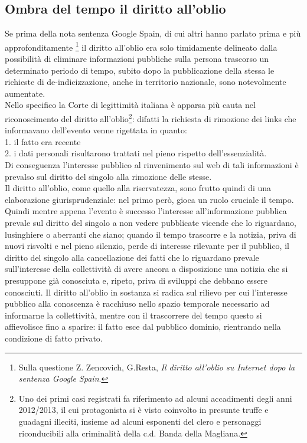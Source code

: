 \subsection{Ombra del tempo il diritto all'oblio}
Se prima della nota sentenza Google Spain, di cui altri hanno parlato prima e più approfonditamente \footnote{Sulla questione Z. Zencovich, G.Resta, \textit{Il diritto all’oblio su Internet dopo la sentenza Google Spain}.} il diritto all'oblio era solo timidamente delineato dalla possibilità di eliminare informazioni pubbliche sulla persona trascorso un determinato periodo di tempo, subito dopo la pubblicazione della stessa le richieste di de-indicizzazione, anche in territorio nazionale, sono notevolmente aumentate.
\\Nello specifico la Corte di legittimità italiana è apparsa più cauta nel riconoscimento del diritto all'oblio\footnote{Uno dei primi casi registrati fa riferimento ad alcuni accadimenti degli anni 2012/2013, il cui protagonista si è visto coinvolto in presunte truffe e guadagni illeciti, insieme ad alcuni esponenti del clero e personaggi riconducibili alla criminalità della c.d. Banda della Magliana.}: difatti la richiesta di rimozione dei links che informavano dell'evento venne rigettata in quanto:
\\1. il fatto era recente
\\2. i dati personali risultarono trattati nel pieno rispetto dell'essenzialità.
\\Di conseguenza l'interesse pubblico al rinvenimento sul web di tali informazioni è prevalso sul diritto del singolo alla rimozione delle stesse.
\\Il diritto all'oblio, come quello alla riservatezza, sono frutto quindi di una elaborazione giurisprudenziale: nel primo però, gioca un ruolo cruciale il tempo.
Quindi mentre appena l'evento è successo l'interesse all'informazione pubblica prevale sul diritto del singolo a non vedere pubblicate vicende che lo riguardano, lusinghiere o aberranti che siano; quando il tempo trascorre e la notizia, priva di nuovi risvolti e nel pieno silenzio, perde di interesse rilevante per il pubblico, il diritto del singolo alla cancellazione dei fatti che lo riguardano prevale sull'interesse della collettività di avere ancora a disposizione una notizia che si presuppone già conosciuta e, ripeto, priva di sviluppi che debbano essere conosciuti.
Il diritto all'oblio in sostanza si radica sul rilievo per cui l'interesse pubblico alla conoscenza è racchiuso nello spazio temporale necessario ad informarne la collettività, mentre con il trascorrere del tempo questo si affievolisce fino a sparire: il fatto esce dal pubblico dominio, rientrando nella condizione di fatto privato.

